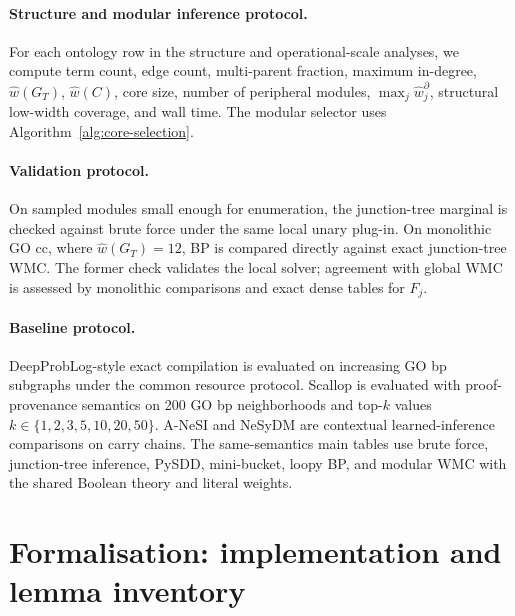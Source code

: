 \documentclass[letterpaper]{article}
\begin{document}
\paragraph{Structure and modular inference protocol.}
For each ontology row in the structure and operational-scale analyses, we
compute term count, edge count,
multi-parent fraction, maximum in-degree, \(\widehat w(G_T)\),
\(\widehat w(C)\), core size, number of peripheral modules,
\(\max_j\widehat w_j^\partial\), structural low-width coverage, and wall
time. The modular selector uses Algorithm~\ref{alg:core-selection}.

\paragraph{Validation protocol.}
On sampled modules small enough for enumeration, the junction-tree marginal is checked against brute force under the same local unary plug-in. On monolithic GO cc, where \(\widehat w(G_T)=12\), BP is compared directly against exact junction-tree WMC. The former check validates the local solver; agreement with global WMC is assessed by monolithic comparisons and exact dense tables for \(F_j\).

\paragraph{Baseline protocol.}
DeepProbLog-style exact compilation is evaluated on increasing GO bp
subgraphs under the common resource protocol. Scallop is evaluated with
proof-provenance semantics on 200 GO bp neighborhoods and top-\(k\) values
\(k\in\{1,2,3,5,10,20,50\}\). A-NeSI and NeSyDM are contextual
learned-inference comparisons on carry chains. The same-semantics main
tables use brute force, junction-tree inference, PySDD, mini-bucket, loopy
BP, and modular WMC with the shared Boolean theory and literal weights.

\section{Formalisation: implementation and lemma inventory}\label{app:lean}
\end{document}
